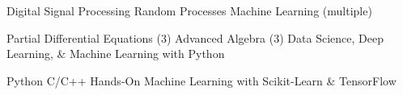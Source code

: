 
\begin{coursework}


  \cvcoursev
    {Digital Signal Processing}
    {Random Processes}
    {Machine Learning (multiple)}

  \cvcoursev
    {Partial Differential Equations (3)}
    {Advanced Algebra (3)}
    {Data Science, Deep Learning, \& Machine Learning with Python}
   
  \cvcoursev
    {Python}
    {C/C++}
    {Hands-On Machine Learning with Scikit-Learn \& TensorFlow}
\end{coursework}
